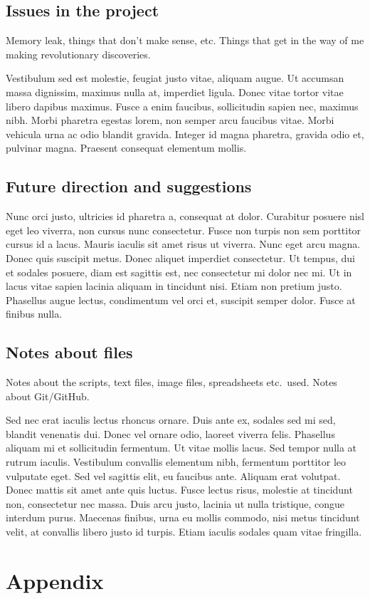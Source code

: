 \documentclass[parskip=full]{scrreprt}
\begin{document}
\section{Issues in the project}
\label{sec:issues}

Memory leak, things that don't make sense, etc. Things that get in the way of me making revolutionary discoveries.

Vestibulum sed est molestie, feugiat justo vitae, aliquam augue. Ut accumsan massa dignissim, maximus nulla at, imperdiet ligula. Donec vitae tortor vitae libero dapibus maximus. Fusce a enim faucibus, sollicitudin sapien nec, maximus nibh. Morbi pharetra egestas lorem, non semper arcu faucibus vitae. Morbi vehicula urna ac odio blandit gravida. Integer id magna pharetra, gravida odio et, pulvinar magna. Praesent consequat elementum mollis.

\section{Future direction and suggestions}
\label{sec:future}

Nunc orci justo, ultricies id pharetra a, consequat at dolor. Curabitur posuere nisl eget leo viverra, non cursus nunc consectetur. Fusce non turpis non sem porttitor cursus id a lacus. Mauris iaculis sit amet risus ut viverra. Nunc eget arcu magna. Donec quis suscipit metus. Donec aliquet imperdiet consectetur. Ut tempus, dui et sodales posuere, diam est sagittis est, nec consectetur mi dolor nec mi. Ut in lacus vitae sapien lacinia aliquam in tincidunt nisi. Etiam non pretium justo. Phasellus augue lectus, condimentum vel orci et, suscipit semper dolor. Fusce at finibus nulla.

\section{Notes about files}
\label{sec:files}

Notes about the scripts, text files, image files, spreadsheets etc.\ used. Notes about Git/GitHub.

Sed nec erat iaculis lectus rhoncus ornare. Duis ante ex, sodales sed mi sed, blandit venenatis dui. Donec vel ornare odio, laoreet viverra felis. Phasellus aliquam mi et sollicitudin fermentum. Ut vitae mollis lacus. Sed tempor nulla at rutrum iaculis. Vestibulum convallis elementum nibh, fermentum porttitor leo vulputate eget. Sed vel sagittis elit, eu faucibus ante. Aliquam erat volutpat. Donec mattis sit amet ante quis luctus. Fusce lectus risus, molestie at tincidunt non, consectetur nec massa. Duis arcu justo, lacinia ut nulla tristique, congue interdum purus. Maecenas finibus, urna eu mollis commodo, nisi metus tincidunt velit, at convallis libero justo id turpis. Etiam iaculis sodales quam vitae fringilla. 

\chapter*{Appendix}
\label{ch:appendix}



\nocite{*}
\printbibliography
\end{document}
